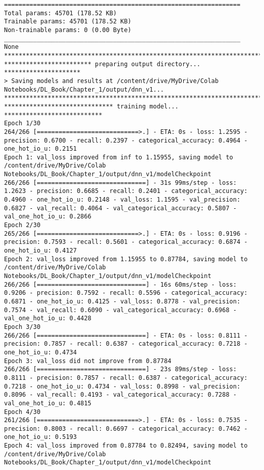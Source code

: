 \documentclass[
  letterpaper,
  DIV=11,
  numbers=noendperiod]{scrreprt}
\begin{document}
\begin{verbatim}
=================================================================
Total params: 45701 (178.52 KB)
Trainable params: 45701 (178.52 KB)
Non-trainable params: 0 (0.00 Byte)
_________________________________________________________________
None
****************************************************************************
************************ preparing output directory... *********************
> Saving models and results at /content/drive/MyDrive/Colab Notebooks/DL_Book/Chapter_1/output/dnn_v1...
****************************************************************************
****************************** training model... ***************************
Epoch 1/30
264/266 [============================>.] - ETA: 0s - loss: 1.2595 - precision: 0.6700 - recall: 0.2397 - categorical_accuracy: 0.4964 - one_hot_io_u: 0.2151
Epoch 1: val_loss improved from inf to 1.15955, saving model to /content/drive/MyDrive/Colab Notebooks/DL_Book/Chapter_1/output/dnn_v1/modelCheckpoint
266/266 [==============================] - 31s 99ms/step - loss: 1.2623 - precision: 0.6685 - recall: 0.2401 - categorical_accuracy: 0.4960 - one_hot_io_u: 0.2148 - val_loss: 1.1595 - val_precision: 0.6827 - val_recall: 0.4064 - val_categorical_accuracy: 0.5807 - val_one_hot_io_u: 0.2866
Epoch 2/30
265/266 [============================>.] - ETA: 0s - loss: 0.9196 - precision: 0.7593 - recall: 0.5601 - categorical_accuracy: 0.6874 - one_hot_io_u: 0.4127
Epoch 2: val_loss improved from 1.15955 to 0.87784, saving model to /content/drive/MyDrive/Colab Notebooks/DL_Book/Chapter_1/output/dnn_v1/modelCheckpoint
266/266 [==============================] - 16s 60ms/step - loss: 0.9206 - precision: 0.7592 - recall: 0.5596 - categorical_accuracy: 0.6871 - one_hot_io_u: 0.4125 - val_loss: 0.8778 - val_precision: 0.7574 - val_recall: 0.6090 - val_categorical_accuracy: 0.6968 - val_one_hot_io_u: 0.4428
Epoch 3/30
266/266 [==============================] - ETA: 0s - loss: 0.8111 - precision: 0.7857 - recall: 0.6387 - categorical_accuracy: 0.7218 - one_hot_io_u: 0.4734
Epoch 3: val_loss did not improve from 0.87784
266/266 [==============================] - 23s 89ms/step - loss: 0.8111 - precision: 0.7857 - recall: 0.6387 - categorical_accuracy: 0.7218 - one_hot_io_u: 0.4734 - val_loss: 0.8998 - val_precision: 0.8096 - val_recall: 0.4193 - val_categorical_accuracy: 0.7288 - val_one_hot_io_u: 0.4815
Epoch 4/30
261/266 [============================>.] - ETA: 0s - loss: 0.7535 - precision: 0.8003 - recall: 0.6697 - categorical_accuracy: 0.7462 - one_hot_io_u: 0.5193
Epoch 4: val_loss improved from 0.87784 to 0.82494, saving model to /content/drive/MyDrive/Colab Notebooks/DL_Book/Chapter_1/output/dnn_v1/modelCheckpoint

\end{verbatim}
\end{document}
